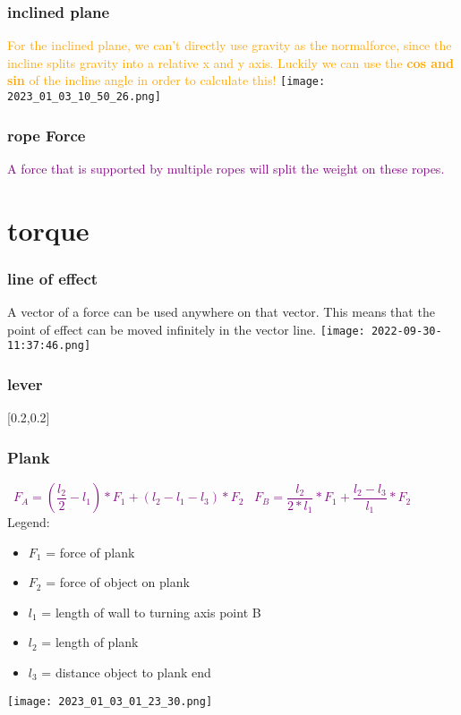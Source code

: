\documentclass[main.tex,fontsize=8pt,paper=a4,paper=portrait,DIV=calc,]{scrartcl}
\begin{document}
\begin{multicols*}{2}
\subsubsection{inclined plane}
\textcolor{orange}{For the inclined plane, we can't directly use gravity as the normalforce, since the incline splits gravity into a relative x and y axis. 
Luckily we can use the \textbf{cos and sin} of the incline angle in order to calculate this!}\newline
\texttt{[image: 2023\_01\_03\_10\_50\_26.png]}

\subsubsection{rope Force}
\textcolor{purple}{A force that is supported by multiple ropes will split the weight on these ropes.}

\section{torque}
\subsubsection{line of effect}
A vector of a force can be used anywhere on that vector.\newline
This means that the point of effect can be moved infinitely in the vector line.\newline
\texttt{[image: 2022-09-30-11:37:46.png]}

\subsubsection{lever} 
[0.2,0.2]

\subsubsection{Plank}
\, \newline
\large \textcolor{purple}{\( F_A =\left(\dfrac{l_2}{2}-l_1\right) * F_1 + \left( l_2-l_1-l_3 \right) * F_2\)}\newline
\, \newline
\large \textcolor{purple}{\( F_B = \dfrac{l_2}{2*l_1} * F_1 + \dfrac{l_2 - l_3}{l_1} * F_2 \)}
\, \newline
\normalsize Legend: \newline
\begin{itemize}
\item \(F_1\) = force of plank
\item \(F_2\) = force of object on plank
\item \(l_1\) = length of wall to turning axis point B 
\item \(l_2\) = length of plank
\item \(l_3\) = distance object to plank end 
\end{itemize} 
\texttt{[image: 2023\_01\_03\_01\_23\_30.png]}


\end{multicols*}
\end{document}

